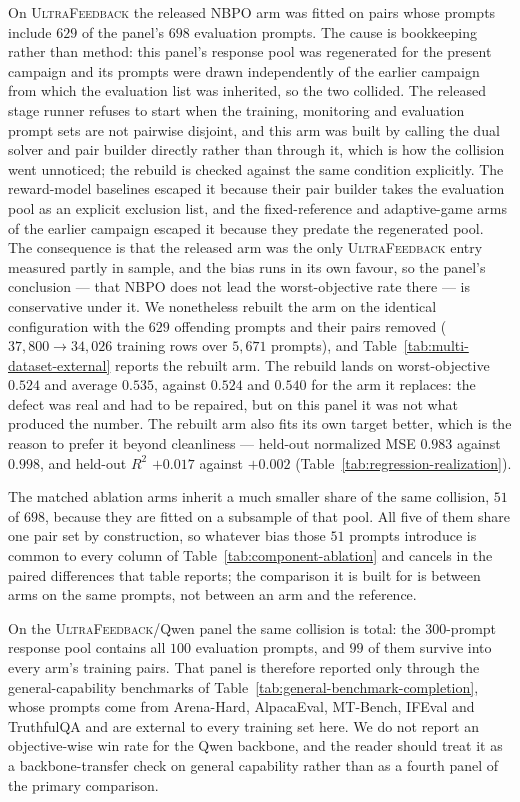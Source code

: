 \documentclass{article}
\theoremstyle{remark}
\theoremstyle{plain}
\newcommand{\NBPO}{\textsc{NBPO}}
\begin{document}
On \textsc{UltraFeedback} the released \NBPO{} arm was fitted on pairs whose prompts include $629$
of the panel's $698$ evaluation prompts. The cause is bookkeeping rather than method: this panel's
response pool was regenerated for the present campaign and its prompts were drawn independently of
the earlier campaign from which the evaluation list was inherited, so the two collided. The released
stage runner refuses to start when the training, monitoring and evaluation prompt sets are not
pairwise disjoint, and this arm was built by calling the dual solver and pair builder directly
rather than through it, which is how the collision went unnoticed; the rebuild is checked against
the same condition explicitly. The
reward-model baselines escaped it because their pair builder takes the evaluation pool as an
explicit exclusion list, and the fixed-reference and adaptive-game arms of the earlier campaign
escaped it because they predate the regenerated pool. The consequence is that the released arm was
the only \textsc{UltraFeedback} entry measured partly in sample, and the bias runs in its own
favour, so the panel's conclusion --- that \NBPO{} does not lead the worst-objective rate there ---
is conservative under it. We nonetheless rebuilt the arm on the identical configuration with the
$629$ offending prompts and their pairs removed ($37{,}800\to34{,}026$ training rows over $5{,}671$
prompts), and Table~\ref{tab:multi-dataset-external} reports the rebuilt arm. The rebuild lands on
worst-objective $0.524$ and average $0.535$, against $0.524$ and $0.540$ for the arm it replaces:
the defect was real and had to be repaired, but on this panel it was not what produced the number.
The rebuilt arm also fits its own target better, which is the reason to prefer it beyond
cleanliness --- held-out normalized MSE $0.983$ against $0.998$, and held-out $R^2$ $+0.017$ against
$+0.002$ (Table~\ref{tab:regression-realization}).

The matched ablation arms inherit a much smaller share of the same collision, $51$ of $698$, because
they are fitted on a subsample of that pool. All five of them share one pair set by construction, so
whatever bias those $51$ prompts introduce is common to every column of
Table~\ref{tab:component-ablation} and cancels in the paired differences that table reports; the
comparison it is built for is between arms on the same prompts, not between an arm and the
reference.

On the \textsc{UltraFeedback}/Qwen panel the same collision is total: the $300$-prompt response
pool contains all $100$ evaluation prompts, and $99$ of them survive into every arm's training
pairs. That panel is therefore reported only through the
general-capability benchmarks of Table~\ref{tab:general-benchmark-completion}, whose prompts come
from Arena-Hard, AlpacaEval, MT-Bench, IFEval and TruthfulQA and are external to every training
set here. We do not report an objective-wise win rate for the Qwen backbone, and the reader should
treat it as a backbone-transfer check on general capability rather than as a fourth panel of the
primary comparison.
\end{document}
